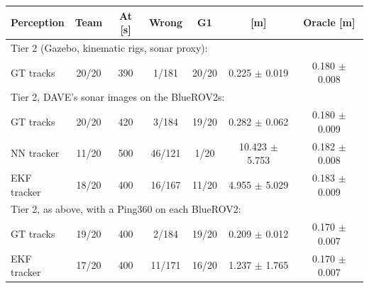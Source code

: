\begin{tabular}{lcccccc}
\toprule
Perception & Team & At [s] & Wrong & G1 & \avatar{} [m] & Oracle [m] \\
\midrule
\multicolumn{7}{l}{Tier 2 (Gazebo, kinematic rigs, sonar proxy):} \\
\quad GT tracks & 20/20 & 390 & 1/181 & 20/20 & 0.225 $\pm$ 0.019 & 0.180 $\pm$ 0.008 \\
\multicolumn{7}{l}{Tier 2, DAVE's sonar images on the BlueROV2s:} \\
\quad GT tracks & 20/20 & 420 & 3/184 & 19/20 & 0.282 $\pm$ 0.062 & 0.180 $\pm$ 0.009 \\
\quad NN tracker & 11/20 & 500 & 46/121 & 1/20 & 10.423 $\pm$ 5.753 & 0.182 $\pm$ 0.008 \\
\quad EKF tracker & 18/20 & 400 & 16/167 & 11/20 & 4.955 $\pm$ 5.029 & 0.183 $\pm$ 0.009 \\
\multicolumn{7}{l}{Tier 2, as above, with a Ping360 on each BlueROV2:} \\
\quad GT tracks & 19/20 & 400 & 2/184 & 19/20 & 0.209 $\pm$ 0.012 & 0.170 $\pm$ 0.007 \\
\quad EKF tracker & 17/20 & 400 & 11/171 & 16/20 & 1.237 $\pm$ 1.765 & 0.170 $\pm$ 0.007 \\
\bottomrule
\end{tabular}
